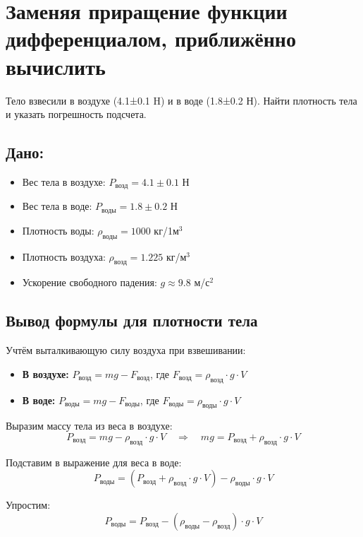 \section{Заменяя приращение функции дифференциалом, приближённо вычислить}

Тело взвесили в воздухе (4.1±0.1 H) и в воде (1.8±0.2 Н). Найти плотность
тела и указать погрешность подсчета.

\subsection*{Дано:}
\begin{itemize}
    \item Вес тела в воздухе: $P_{\text{возд}} = 4.1 \pm 0.1$ Н
    \item Вес тела в воде: $P_{\text{воды}} = 1.8 \pm 0.2$ Н
    \item Плотность воды: $\rho_{\text{воды}} = 1000$ кг/1м$^3$
    \item Плотность воздуха: $\rho_{\text{возд}} = 1.225$ кг/м$^3$
    \item Ускорение свободного падения: $g \approx 9.8$ м/с$^2$
\end{itemize}

\subsection{Вывод формулы для плотности тела}

Учтём выталкивающую силу воздуха при взвешивании:

\begin{itemize}
    \item \textbf{В воздухе:} $P_{\text{возд}} = mg - F_{\text{возд}}$, где $F_{\text{возд}} = \rho_{\text{возд}} \cdot g \cdot V$
    \item \textbf{В воде:} $P_{\text{воды}} = mg - F_{\text{воды}}$, где $F_{\text{воды}} = \rho_{\text{воды}} \cdot g \cdot V$
\end{itemize}

Выразим массу тела из веса в воздухе:
\[
P_{\text{возд}} = mg - \rho_{\text{возд}} \cdot g \cdot V \quad \Rightarrow \quad mg = P_{\text{возд}} + \rho_{\text{возд}} \cdot g \cdot V
\]

Подставим в выражение для веса в воде:
\[
P_{\text{воды}} = (P_{\text{возд}} + \rho_{\text{возд}} \cdot g \cdot V) - \rho_{\text{воды}} \cdot g \cdot V
\]

Упростим:
\[
P_{\text{воды}} = P_{\text{возд}} - (\rho_{\text{воды}} - \rho_{\text{возд}}) \cdot g \cdot V
\]


